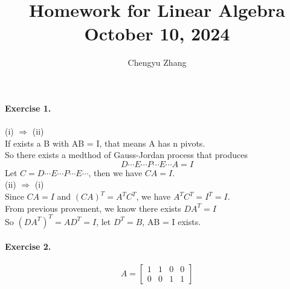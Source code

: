 \documentclass{article}
\title{\vspace*{-3.5cm}Homework for Linear Algebra \\October 10, 2024}
\author{Chengyu Zhang}
\date{}
\begin{document}
\maketitle

\paragraph{Exercise 1.}
(i) $\Rightarrow$ (ii) \\
If exists a B with AB = I, that means A has n pivots.\\
So there exists a medthod of Gauss-Jordan process that produces 
\[
    D\cdots E\cdots P\cdots E\cdots A = I 
\]
Let $C=D\cdots E\cdots P\cdots E\cdots$, then we have $CA=I$.\\
(ii) $\Rightarrow$ (i) \\
Since $CA = I$ and $(CA)^T=A^TC^T$, we have $A^TC^T=I^T=I$.\\
From previous provement, we know there exists $DA^T=I$\\
So $(DA^T)^T=AD^T=I$, let $D^T=B$, AB = I exists.

\paragraph{Exercise 2.}
\[
A=\begin{bmatrix}
    1 & 1 & 0 & 0\\
    0 & 0 & 1 & 1
\end{bmatrix}
\]
\end{document}
